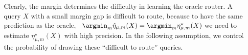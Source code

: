 


Clearly, the margin determines the difficulty in learning the oracle router. A query $X$ with a small margin gap is difficult to route, because to have the same prediction as the oracle, \ie\  $\argmin_{m} \hat \eta_{\mu, m}(X) = \argmin_{m} \eta_{\mu, m}^\star(X)$ we need to estimate $ \eta_{\mu, m}^\star(X)$ with high precision. In the following assumption, we control the probability of drawing these ``difficult to route'' queries.

